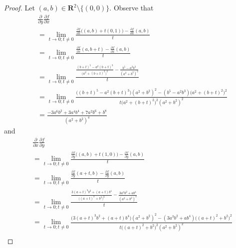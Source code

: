 \begin{proof}
    Let \((a, b) \in \mathbf{R}^2 \setminus \{(0, 0)\}\).
    Observe that
    \begin{align*}
         & \frac{\partial}{\partial y} \frac{\partial f}{\partial x}                                                                                                                       \\
         & = \lim_{t \to 0 ; t \neq 0} \frac{\frac{\partial f}{\partial x}\big((a, b) + t(0, 1)\big) - \frac{\partial f}{\partial x}(a, b)}{t}                                             \\
         & = \lim_{t \to 0 ; t \neq 0} \frac{\frac{\partial f}{\partial x}(a, b + t) - \frac{\partial f}{\partial x}(a, b)}{t}                                                             \\
         & = \lim_{t \to 0 ; t \neq 0} \frac{\frac{(b + t)^5 - a^2 (b + t)^3}{\big(a^2 + (b + t)^2\big)^2} - \frac{b^5 - a^2 b^3}{(a^2 + b^2)^2}}{t}                                       \\
         & = \lim_{t \to 0 ; t \neq 0} \frac{\big((b + t)^5 - a^2 (b + t)^3\big) (a^2 + b^2)^2 - (b^5 - a^2 b^3) \big(a^2 + (b + t)^2\big)^2}{t \big(a^2 + (b + t)^2\big)^2 (a^2 + b^2)^2} \\
         & = \frac{-3 a^6 b^2 + 3 a^4 b^4 + 7 a^2 b^6 + b^8}{(a^2 + b^2)^4}
    \end{align*}
    and
    \begin{align*}
         & \frac{\partial}{\partial x} \frac{\partial f}{\partial y}                                                                                                                               \\
         & = \lim_{t \to 0 ; t \neq 0} \frac{\frac{\partial f}{\partial y}\big((a, b) + t(1, 0)\big) - \frac{\partial f}{\partial y}(a, b)}{t}                                                     \\
         & = \lim_{t \to 0 ; t \neq 0} \frac{\frac{\partial f}{\partial y}(a + t, b) - \frac{\partial f}{\partial y}(a, b)}{t}                                                                     \\
         & = \lim_{t \to 0 ; t \neq 0} \frac{\frac{3 (a + t)^3 b^2 + (a + t) b^4}{\big((a + t)^2 + b^2\big)^2} - \frac{3 a^3 b^2 + a b^4}{(a^2 + b^2)^2}}{t}                                       \\
         & = \lim_{t \to 0 ; t \neq 0} \frac{\big(3 (a + t)^3 b^2 + (a + t) b^4\big) (a^2 + b^2)^2 - (3 a^3 b^2 + a b^4) \big((a + t)^2 + b^2\big)^2}{t \big((a + t)^2 + b^2\big)^2 (a^2 + b^2)^2} \\

\end{align*}
\end{proof}
